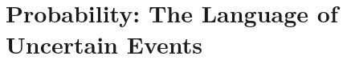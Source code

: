 \chapter{Probability: The Language of Uncertain Events}\label{ch:01}
\providecommand{\OneAMaskN}{}\renewcommand{\OneAMaskN}{100000}
\providecommand{\OneAMaskFreqA}{}\renewcommand{\OneAMaskFreqA}{0.5004}
\providecommand{\OneAMaskFreqB}{}\renewcommand{\OneAMaskFreqB}{0.2757}
\providecommand{\OneAMaskFreqAB}{}\renewcommand{\OneAMaskFreqAB}{0.1663}
\providecommand{\OneAMaskFreqAorB}{}\renewcommand{\OneAMaskFreqAorB}{0.6099}
\providecommand{\OneAMaskExA}{}\renewcommand{\OneAMaskExA}{0.5000}
\providecommand{\OneAMaskExB}{}\renewcommand{\OneAMaskExB}{0.2778}
\providecommand{\OneAMaskExAB}{}\renewcommand{\OneAMaskExAB}{0.1667}
\providecommand{\OneAMaskExAorB}{}\renewcommand{\OneAMaskExAorB}{0.6111}
\providecommand{\OneAMaskDeMorgan}{}\renewcommand{\OneAMaskDeMorgan}{0}
\providecommand{\OneAMaskIEGap}{}\renewcommand{\OneAMaskIEGap}{0}
\providecommand{\OneARunFinalA}{}\renewcommand{\OneARunFinalA}{0.320}
\providecommand{\OneARunFinalAtwo}{}\renewcommand{\OneARunFinalAtwo}{0.275}
\providecommand{\OneARunFinalB}{}\renewcommand{\OneARunFinalB}{0.032}
\providecommand{\OneARunFinalBtwo}{}\renewcommand{\OneARunFinalBtwo}{0.026}
\providecommand{\OneARunBandA}{}\renewcommand{\OneARunBandA}{0.029}
\providecommand{\OneARunBandB}{}\renewcommand{\OneARunBandB}{0.011}
\providecommand{\OneARunInsideA}{}\renewcommand{\OneARunInsideA}{4}
\providecommand{\OneARunInsideB}{}\renewcommand{\OneARunInsideB}{4}
\providecommand{\OneARunRuns}{}\renewcommand{\OneARunRuns}{4}
\providecommand{\OneABdayExact}{}\renewcommand{\OneABdayExact}{0.5073}
\providecommand{\OneABdayApprox}{}\renewcommand{\OneABdayApprox}{0.5000}
\providecommand{\OneABdayMC}{}\renewcommand{\OneABdayMC}{0.5070}
\providecommand{\OneABdayKhalf}{}\renewcommand{\OneABdayKhalf}{23}
\providecommand{\OneABdayExactFifty}{}\renewcommand{\OneABdayExactFifty}{0.970}
\providecommand{\OneABdayPixExact}{}\renewcommand{\OneABdayPixExact}{0.3914}
\providecommand{\OneABdayPixMC}{}\renewcommand{\OneABdayPixMC}{0.3951}
\providecommand{\OneABdayPixApprox}{}\renewcommand{\OneABdayPixApprox}{0.3904}
\providecommand{\OneABdayMCErr}{}\renewcommand{\OneABdayMCErr}{0.0011}
\providecommand{\OneABdayPixMCErr}{}\renewcommand{\OneABdayPixMCErr}{0.0015}
\providecommand{\OneABdayPull}{}\renewcommand{\OneABdayPull}{0.3}
\providecommand{\OneABdayPixPull}{}\renewcommand{\OneABdayPixPull}{2.3}
\providecommand{\OneACondN}{}\renewcommand{\OneACondN}{200000}
\providecommand{\OneACondNB}{}\renewcommand{\OneACondNB}{61090}
